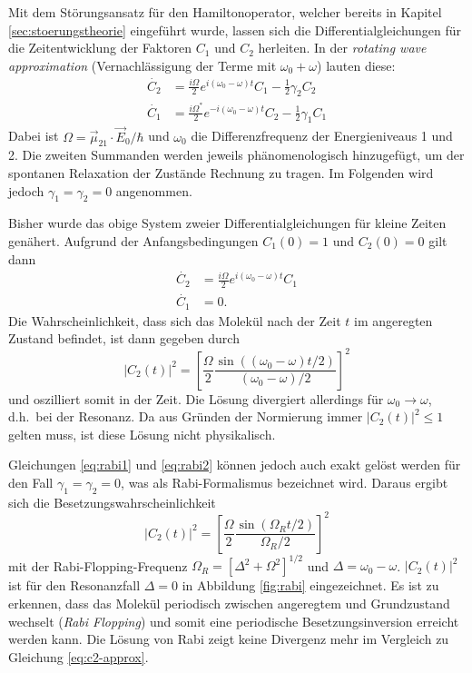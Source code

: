 Mit dem Störungsansatz für den Hamiltonoperator, welcher bereits in Kapitel \ref{sec:stoerungstheorie} eingeführt wurde, lassen sich die Differentialgleichungen für die Zeitentwicklung der Faktoren $C_{1}$ und $C_{2}$ herleiten. In der \emph{rotating wave approximation} (Vernachlässigung der Terme mit $\omega_{0} + \omega$) lauten diese:
\begin{align}
    \dot{C_{2}} & = \frac{i \Omega}{2} e^{i (\omega_{0} - \omega) t} C_{1} - \frac{1}{2} \gamma_{2} C_{2} \label{eq:rabi1} \\
    \dot{C_{1}} & = \frac{i \Omega^{\ast}}{2} e^{-i (\omega_{0} - \omega) t} C_{2} - \frac{1}{2} \gamma_{1} C_{1} \label{eq:rabi2}
\end{align}
Dabei ist $\Omega = \vec{\mu}_{21} \cdot \vec{E}_{0} / \hbar$ und $\omega_{0}$ die Differenzfrequenz der Energieniveaus 1 und 2. Die zweiten Summanden werden jeweils phänomenologisch hinzugefügt, um der spontanen Relaxation der Zustände Rechnung zu tragen. Im Folgenden wird jedoch $\gamma_{1} = \gamma_{2} = 0$ angenommen.

Bisher wurde das obige System zweier Differentialgleichungen für kleine Zeiten genähert. Aufgrund der Anfangsbedingungen $C_{1}(0) = 1$ und $C_{2}(0) = 0$ gilt dann
\begin{align}
    \dot{C_{2}} & = \frac{i \Omega}{2} e^{i (\omega_{0} - \omega) t} C_{1} \\
    \dot{C_{1}} & = 0.
\end{align}
Die Wahrscheinlichkeit, dass sich das Molekül nach der Zeit $t$ im angeregten Zustand befindet, ist dann gegeben durch
\begin{equation}
    \vert C_{2}(t) \vert^{2} = \left[ \frac{\Omega}{2} \frac{\sin((\omega_{0} - \omega) t/2)}{(\omega_{0} - \omega)/2} \right]^{2}
    \label{eq:c2-approx}
\end{equation}
und oszilliert somit in der Zeit. Die Lösung divergiert allerdings für $\omega_{0} \rightarrow \omega$, d.h.\ bei der Resonanz. Da aus Gründen der Normierung immer $\vert C_{2}(t) \vert^{2} \leq 1$ gelten muss, ist diese Lösung nicht physikalisch.

Gleichungen \ref{eq:rabi1} und \ref{eq:rabi2} können jedoch auch exakt gelöst werden für den Fall $\gamma_{1} = \gamma_{2} = 0$, was als Rabi-Formalismus bezeichnet wird. Daraus ergibt sich die Besetzungswahrscheinlichkeit
\begin{equation}
    \vert C_{2}(t) \vert^{2} = \left[ \frac{\Omega}{2} \frac{\sin(\Omega_{R} t/2)}{\Omega_{R}/2} \right]^{2}
\end{equation}
mit der Rabi-Flopping-Frequenz $\Omega_{R} = [ \Delta^{2} + \Omega^{2} ]^{1/2}$ und $\Delta = \omega_{0} - \omega$. $\vert C_{2}(t) \vert^{2}$ ist für den Resonanzfall $\Delta = 0$ in Abbildung \ref{fig:rabi} eingezeichnet. Es ist zu erkennen, dass das Molekül periodisch zwischen angeregtem und Grundzustand wechselt (\emph{Rabi Flopping}) und somit eine periodische Besetzungsinversion erreicht werden kann. Die Lösung von Rabi zeigt keine Divergenz mehr im Vergleich zu Gleichung \ref{eq:c2-approx}.

